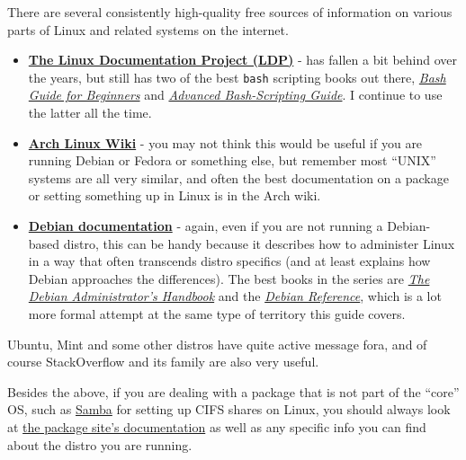 \documentclass[10pt,]{book}
\numberwithin{figure}{chapter}
\begin{document}
There are several consistently high-quality free sources of information
on various parts of Linux and related systems on the internet.

\begin{itemize}
\item
  \href{http://www.tldp.org/guides.html}{\textbf{The Linux Documentation
  Project (LDP)}} - has fallen a bit behind over the years, but still
  has two of the best \texttt{bash} scripting books out there,
  \href{http://www.tldp.org/LDP/Bash-Beginners-Guide/html/index.html}{\emph{Bash
  Guide for Beginners}} and
  \href{http://www.tldp.org/LDP/abs/html/index.html}{\emph{Advanced
  Bash-Scripting Guide}}. I continue to use the latter all the time.
\item
  \href{https://wiki.archlinux.org/}{\textbf{Arch Linux Wiki}} - you may
  not think this would be useful if you are running Debian or Fedora or
  something else, but remember most ``UNIX'' systems are all very
  similar, and often the best documentation on a package or setting
  something up in Linux is in the Arch wiki.
\item
  \href{https://www.debian.org/doc/}{\textbf{Debian documentation}} -
  again, even if you are not running a Debian-based distro, this can be
  handy because it describes how to administer Linux in a way that often
  transcends distro specifics (and at least explains how Debian
  approaches the differences). The best books in the series are
  \href{https://www.debian.org/doc/manuals/debian-handbook/}{\emph{The
  Debian Administrator's Handbook}} and the
  \href{https://www.debian.org/doc/manuals/debian-reference/}{\emph{Debian
  Reference}}, which is a lot more formal attempt at the same type of
  territory this guide covers.
\end{itemize}

Ubuntu, Mint and some other distros have quite active message fora, and
of course StackOverflow and its family are also very useful.

Besides the above, if you are dealing with a package that is not part of
the ``core'' OS, such as \href{https://www.samba.org/samba/}{Samba} for
setting up CIFS shares on Linux, you should always look at
\href{https://www.samba.org/samba/docs/}{the package site's
documentation} as well as any specific info you can find about the
distro you are running.

\end{document}
